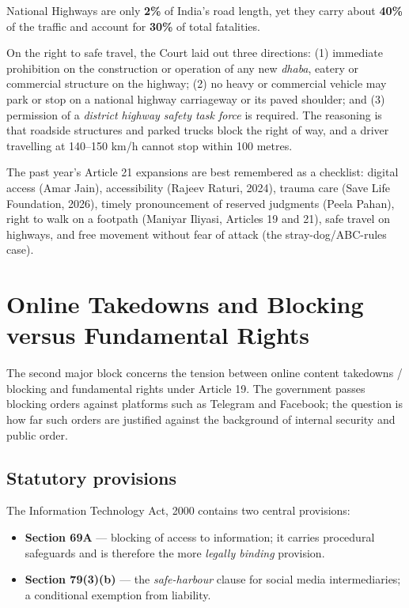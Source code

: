 \begin{DataFact}
National Highways are only \textbf{2\%} of India's road length, yet they carry about
\textbf{40\%} of the traffic and account for \textbf{30\%} of total fatalities.
\end{DataFact}

\begin{ExampleBox}
On the right to safe travel, the Court laid out three directions: (1) immediate
prohibition on the construction or operation of any new \emph{dhaba}, eatery or
commercial structure on the highway; (2) no heavy or commercial vehicle may park or stop
on a national highway carriageway or its paved shoulder; and (3) permission of a
\emph{district highway safety task force} is required. The reasoning is that roadside
structures and parked trucks block the right of way, and a driver travelling at 140--150
km/h cannot stop within 100 metres.
\end{ExampleBox}

\begin{QuickRevision}
The past year's Article 21 expansions are best remembered as a checklist: digital access
(Amar Jain), accessibility (Rajeev Raturi, 2024), trauma care (Save Life Foundation,
2026), timely pronouncement of reserved judgments (Peela Pahan), right to walk on a
footpath (Maniyar Iliyasi, Articles 19 and 21), safe travel on highways, and free
movement without fear of attack (the stray-dog/ABC-rules case).
\end{QuickRevision}

\section{Online Takedowns and Blocking versus Fundamental Rights}
\label{sec:online-blocking}

The second major block concerns the tension between online content takedowns / blocking
and fundamental rights under Article 19. The government passes blocking orders against
platforms such as Telegram and Facebook; the question is how far such orders are
justified against the background of internal security and public order.

\subsection{Statutory provisions}

The Information Technology Act, 2000 contains two central provisions:

\begin{itemize}
  \item \textbf{Section 69A} — blocking of access to information; it carries procedural
        safeguards and is therefore the more \emph{legally binding} provision.
  \item \textbf{Section 79(3)(b)} — the \emph{safe-harbour} clause for social media
        intermediaries; a conditional exemption from liability.
\end{itemize}

